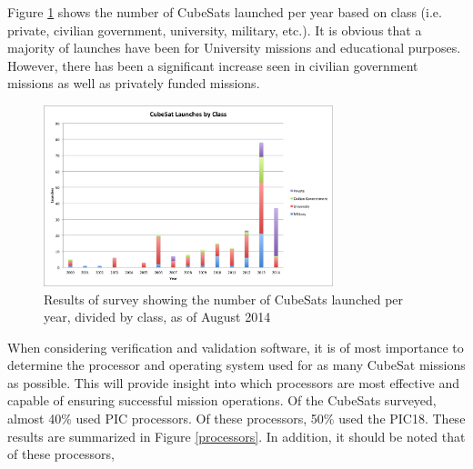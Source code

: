 \documentclass[11pt]{article}
\begin{document}
Figure \ref{classperyear} shows the number of CubeSats launched per year based on class (i.e. private, civilian government, university, military, etc.).  It is obvious that a majority of launches have been for University missions and educational purposes.  However, there has been a significant increase seen in civilian government missions as well as privately funded missions.  

\begin{figure}[ht!]
\centering
\includegraphics[width=0.75\textwidth]{ClassPerYear.png}
\caption{Results of survey showing the number of CubeSats launched per year, divided by class, as of August 2014}
\label{classperyear}
\end{figure}

When considering verification and validation software, it is of most importance to determine the processor and operating system used for as many CubeSat missions as possible.  This will provide insight into which processors are most effective and capable of ensuring successful mission operations.  Of the CubeSats surveyed, almost 40\% used PIC processors.  Of these processors, 50\% used the PIC18.  These results are summarized in Figure \ref{processors}.  In addition, it should be noted that of these processors, 
\end{document}
